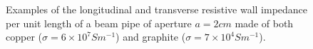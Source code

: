 \begin{figure}

\caption{Examples of the longitudinal  and transverse  resistive wall impedance per unit length of a beam pipe of aperture $a = 2cm$ made of both copper ($\sigma = 6 \times 10^{7} S m^{-1}$) and graphite ($\sigma = 7 \times 10^{4} S m^{-1}$).}
\label{fig:resWallImpComp}
\end{figure}

